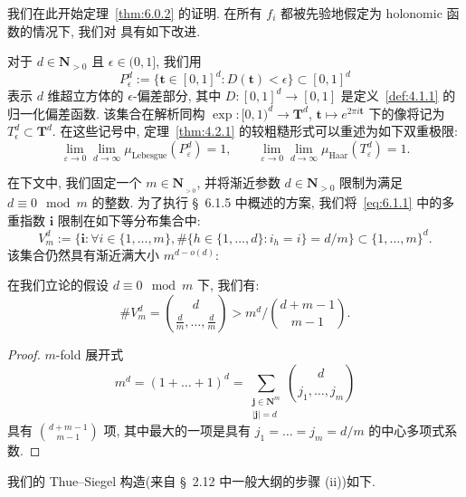 我们在此开始定理~\ref{thm:6.0.2} 的证明.
在所有 $f_i$ 都被先验地假定为 holonomic 函数的情况下, 我们对 \cite[Lemma 2.1.2]{CDT21} 具有如下改进.

对于 $d \in \mathbf{N}_{>0}$ 且 $\epsilon \in (0,1]$, 我们用
\begin{equation}\label{eq:6.2.1}
P_{\epsilon}^{d} := \{ \mathbf{t} \in [0,1]^{d} : D(\mathbf{t}) < \epsilon \} \subset [0,1]^{d}
\end{equation}
表示 $d$ 维超立方体的 $\epsilon$-偏差部分, 其中 $D:[0,1]^d \to [0,1]$ 是定义~\ref{def:4.1.1} 的归一化偏差函数.
该集合在解析同构 $\exp:[0,1)^d \to \mathbf{T}^d$, $\mathbf{t} \mapsto e^{2\pi i \mathbf{t}}$ 下的像将记为 $T^d_\epsilon \subset \mathbf{T}^d$.
在这些记号中, 定理~\ref{thm:4.2.1} 的较粗糙形式可以重述为如下双重极限:
\begin{equation}\label{eq:6.2.2}
\lim_{\varepsilon \to 0} \lim_{d \to \infty} \mu_{\text{Lebesgue}}(P_{\varepsilon}^{d}) = 1, \qquad \lim_{\varepsilon \to 0} \lim_{d \to \infty} \mu_{\text{Haar}}(T_{\varepsilon}^{d}) = 1.
\end{equation}

在下文中, 我们固定一个 $m \in \mathbf{N}_{_{>0}}$, 并将渐近参数 $d \in \mathbf{N}_{>0}$ 限制为满足 $d \equiv 0 \mod m$ 的整数.
为了执行 \S~6.1.5 中概述的方案, 我们将~\eqref{eq:6.1.1} 中的多重指数 $\mathbf{i}$ 限制在如下等分布集合中:
\begin{equation}\label{eq:6.2.3}
V_m^d := \{ \mathbf{i} : \forall i \in \{1, \dots, m\}, \#\{h \in \{1, \dots, d\} : i_h = i\} = d/m \} \subset \{1, \dots, m\}^d.
\end{equation}
该集合仍然具有渐近满大小 $m^{d-o(d)}$:

\begin{lemma}\label{lem:6.2.4}
在我们立论的假设 $d \equiv 0 \mod m$ 下, 我们有:
\begin{equation}\label{eq:6.2.5}
\#V_m^d = {d \choose \frac{d}{m}, \dots, \frac{d}{m}} > m^d / {d+m-1 \choose m-1}.
\end{equation}
\end{lemma}

\begin{proof}
$m$-fold 展开式
\[ m^{d} = (1 + \dots + 1)^{d} = \sum_{\substack{\mathbf{j} \in \mathbf{N}^{m} \\ |\mathbf{j}| = d}} {d \choose j_{1}, \dots, j_{m}} \]
具有 $\binom{d+m-1}{m-1}$ 项, 其中最大的一项是具有 $j_1=\dots=j_m=d/m$ 的中心多项式系数.
\end{proof}

我们的 Thue--Siegel 构造(来自 \S~2.12 中一般大纲的步骤 (ii))如下.

